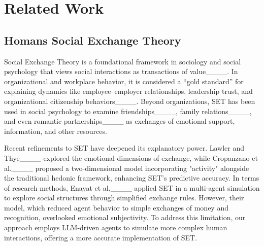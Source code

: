 \section{Related Work}
\subsection{Homans Social Exchange Theory}
Social Exchange Theory is a foundational framework in sociology and social psychology that views social interactions as transactions of value____. In organizational and workplace behavior, it is considered a “gold standard” for explaining dynamics like employee–employer relationships, leadership trust, and organizational citizenship behaviors____. Beyond organizations, SET has been used in social psychology to examine friendships____, family relations____, and even romantic partnerships____ as exchanges of emotional support, information, and other resources. 

Recent refinements to SET have deepened its explanatory power. Lawler and Thye____ explored the emotional dimensions of exchange, while Cropanzano et al.____ proposed a two-dimensional model incorporating "activity" alongside the traditional hedonic framework, enhancing SET’s predictive accuracy. In terms of research methods, Enayat et al.____ applied SET in a multi-agent simulation to explore social structures through simplified exchange rules. However, their model, which reduced agent behavior to simple exchanges of money and recognition, overlooked emotional subjectivity. To address this limitation, our approach employs LLM-driven agents to simulate more complex human interactions, offering a more accurate implementation of SET.

